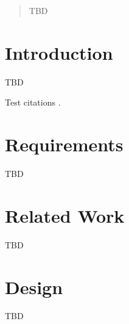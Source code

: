 \documentclass{tex/sig-alternate-2013}
\begin{document}
{%

\date{27 April 2014}

\maketitle
\begin{abstract}

TBD


\end{abstract}




\section{Introduction}

TBD

Test citations \cite{las2010gce,las12fg-bookchapter}.

\section{Requirements}

TBD


\section{Related Work}

TBD


\section{Design}

TBD

}
\end{document}
